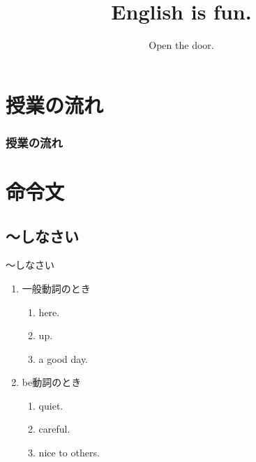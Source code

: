\documentclass[aspectratio=169,xcolor={dvipsnames,table}]{beamer}
\title{English is fun.}
\subtitle{Open the door.
}
\author{}
\institute[]{}
\date[]
\begin{document}
\begin{frame}[plain]
  \titlepage
\end{frame}

\section*{授業の流れ}
\begin{frame}[plain]
  \frametitle{授業の流れ}
  \tableofcontents
\end{frame}

\section{命令文}
\subsection{〜しなさい}
\begin{frame}[plain]{～しなさい}
 \large


\begin{enumerate}
\item<2-> 一般動詞のとき
      \begin{enumerate}
	\item<3->  here.
	\item<4->  up.
	\item<5->  a good day.
      \end{enumerate}
 \item<6-> be動詞のとき
       \begin{enumerate}
	\item<7->  quiet.  
	\item<8->  careful.
	\item<9->  nice to others.
       \end{enumerate}\end{enumerate}

\end{frame}
\end{document}
